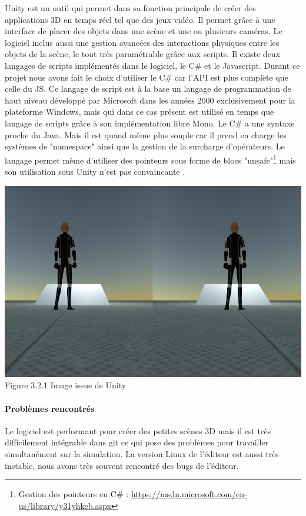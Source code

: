 \documentclass[12pt,a4paper]{report}
\begin{document}
Unity est un outil qui permet dans sa fonction principale de créer des applications 3D en temps réel tel que des jeux vidéo. Il permet grâce à une interface de placer des objets dans une scène et une ou plusieurs caméras. Le logiciel inclus aussi une gestion avancées des interactions physiques entre les objets de la scène, le tout très paramétrable grâce aux scripts. Il existe deux langages de scripts implémentés dans le logiciel, le C\# et le Javascript. Durant ce projet nous avons fait le choix d'utiliser le C\# car l'API est plus complète que celle du JS.
Ce langage de script est à la base un langage de programmation de haut niveau développé par Microsoft dans les années 2000 exclusivement pour la plateforme Windows, mais qui dans ce cas présent est utilisé en temps que langage de scripts grâce à son implémentation libre Mono. Le C\# a une syntaxe proche du Java. Mais il est quand même plus souple car il prend en charge les systèmes de "namespace" ainsi que la gestion de la surcharge d'opérateurs. Le langage permet même d'utiliser des pointeurs sous forme de blocs "unsafe"\footnote{Gestion des pointeurs en C\# : \url{https://msdn.microsoft.com/en-us/library/y31yhkeb.aspx}} mais son utilisation sous Unity n'est pas convaincante .

	\begin{center}
		\includegraphics[scale=0.5]{Screenshot_skybox.png}
		Figure 3.2.1 Image issue de Unity\\
	\end{center}
 	
\paragraph{Problèmes rencontrés}
Le logiciel est performant pour créer des petites scènes 3D mais il est très difficilement intégrable dans git ce qui pose des problèmes pour travailler simultanément sur la simulation. La version Linux de l'éditeur est aussi très instable, nous avons très souvent rencontré des bugs de l'éditeur.
\end{document}
